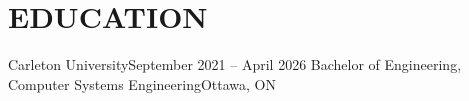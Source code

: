 \section{\textbf {\large EDUCATION}}
\resumeSubHeadingListStart %

\resumeSubheading %
{Carleton University}{September 2021 -- April 2026}
{Bachelor of Engineering, Computer Systems Engineering}{Ottawa, ON}
\resumeItemListStart %
\resumeItemListEnd %

\resumeSubHeadingListEnd %
